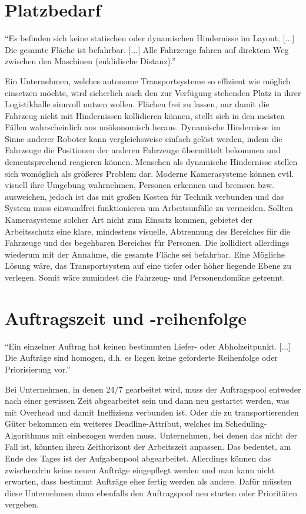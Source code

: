 \documentclass[ngerman]{tudscrreprt}
\begin{document}
\section{Platzbedarf}
\begin{displayquote}
    ``Es befinden sich keine statischen oder dynamischen Hindernisse im Layout. [...] Die gesamte Fläche ist befahrbar. [...] Alle Fahrzeuge fahren auf direktem Weg zwischen den Maschinen (euklidische Distanz).'' \cite{aufgabenstellung}
\end{displayquote}
%
Ein Unternehmen, welches autonome Transportsysteme so effizient wie möglich einsetzen möchte, wird sicherlich auch den zur Verfügung stehenden Platz in ihrer Logistikhalle sinnvoll nutzen wollen. Flächen frei zu lassen, nur damit die Fahrzeug nicht mit Hindernissen kollidieren können, stellt sich in den meisten Fällen wahrscheinlich aus unökonomisch heraus. Dynamische Hindernisse im Sinne anderer Roboter kann vergleichsweise einfach gelöst werden, indem die Fahrzeuge die Positionen der anderen Fahrzeuge übermittelt bekommen und dementsprechend reagieren können. Menschen als dynamische Hindernisse stellen sich womöglich als größeres Problem dar. Moderne Kamerasysteme können evtl. visuell ihre Umgebung wahrnehmen, Personen erkennen und bremsen bzw. ausweichen, jedoch ist das mit großen Kosten für Technik verbunden und das System muss einwandfrei funktionieren um Arbeitsunfälle zu vermeiden. Sollten Kamerasysteme solcher Art nicht zum Einsatz kommen, gebietet der Arbeitsschutz eine klare, mindestens visuelle, Abtrennung des Bereiches für die Fahrzeuge und des begehbaren Bereiches für Personen. Die kollidiert allerdings wiederum mit der Annahme, die gesamte Fläche sei befahrbar. Eine Mögliche Lösung wäre, das Transportsystem auf eine tiefer oder höher liegende Ebene zu verlegen. Somit wäre zumindest die Fahrzeug- und Personendomäne getrennt.

\section{Auftragszeit und -reihenfolge}
\begin{displayquote}
    ``Ein einzelner Auftrag hat keinen bestimmten Liefer- oder Abholzeitpunkt. [...] Die Aufträge sind homogen, d.h. es liegen keine geforderte Reihenfolge oder Priorisierung vor.'' \cite{aufgabenstellung}
\end{displayquote}
%
Bei Unternehmen, in denen 24/7 gearbeitet wird, muss der Auftragspool entweder nach einer gewissen Zeit abgearbeitet sein und dann neu gestartet werden, was mit Overhead und damit Ineffizienz verbunden ist. Oder die zu transportierenden Güter bekommen ein weiteres Deadline-Attribut, welches im Scheduling-Algorithmus mit einbezogen werden muss. Unternehmen, bei denen das nicht der Fall ist, könnten ihren Zeithorizont der Arbeitszeit anpassen. Das bedeutet, am Ende des Tages ist der Aufgabenpool abgearbeitet. Allerdings können das zwischendrin keine neuen Aufträge eingepflegt werden und man kann nicht erwarten, dass bestimmt Aufträge eher fertig werden als andere. Dafür müssten diese Unternehmen dann ebenfalls den Auftragspool neu starten oder Prioritäten vergeben.
\end{document}
